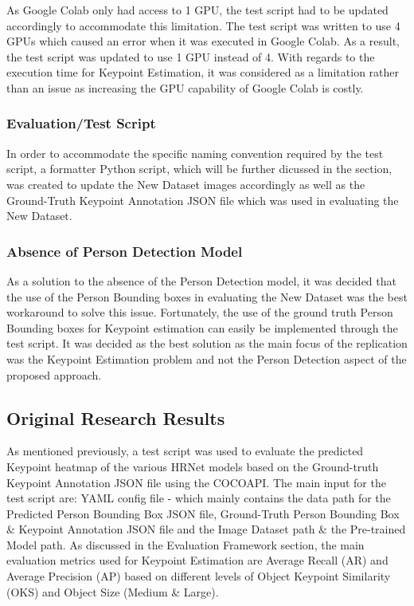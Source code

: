 \documentclass[a4paper,12pt]{article}
\begin{document}
As Google Colab only had access to 1 GPU, the test script had to be updated accordingly to accommodate this limitation. The test script was written to use 4 GPUs which caused an error when it was executed in Google Colab. As a result, the test script was updated to use 1 GPU instead of 4. With regards to the execution time for Keypoint Estimation, it was considered as a limitation rather than an issue as increasing the GPU capability of Google Colab is costly.\par

\subsubsection*{Evaluation/Test Script}

In order to accommodate the specific naming convention required by the test script, a formatter Python script, which will be further dicussed in the  section, was created to update the New Dataset images accordingly as well as the Ground-Truth Keypoint Annotation JSON file which was used in evaluating the New Dataset.\par

\subsubsection*{Absence of Person Detection Model}

As a solution to the absence of the Person Detection model, it was decided that the use of the Person Bounding boxes in evaluating the New Dataset was the best workaround to solve this issue. Fortunately, the use of the ground truth Person Bounding boxes for Keypoint estimation can easily be implemented through the test script. It was decided as the best solution as the main focus of the replication was the Keypoint Estimation problem and not the Person Detection aspect of the proposed approach.\par

\subsection{Original Research Results}

As mentioned previously, a test script was used to evaluate the predicted Keypoint heatmap of the various HRNet models based on the Ground-truth Keypoint Annotation JSON file using the COCOAPI. The main input for the test script are: YAML config file - which mainly contains the data path for the Predicted Person Bounding Box JSON file, Ground-Truth Person Bounding Box & Keypoint Annotation JSON file and the Image Dataset path \& the Pre-trained Model path.  As discussed in the Evaluation Framework section, the main evaluation metrics used for Keypoint Estimation are Average Recall (AR) and Average Precision (AP) based on different levels of Object Keypoint Similarity (OKS) and Object Size (Medium \& Large).\par
\end{document}
